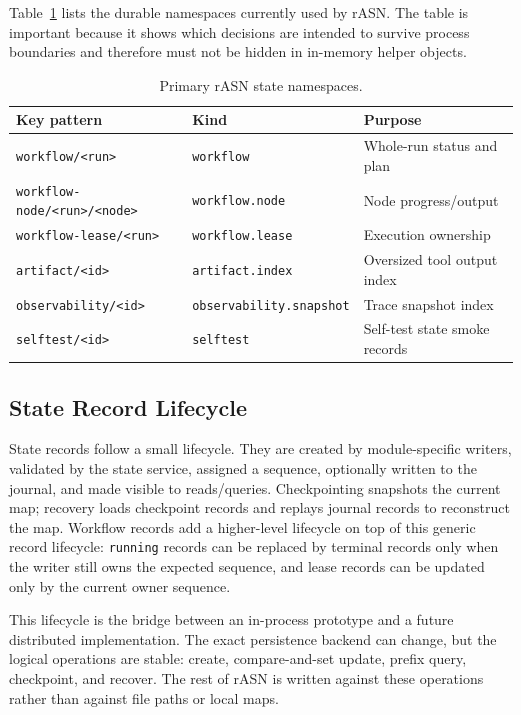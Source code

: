 \documentclass[manuscript,screen,review]{acmart}
\newcommand{\rasn}{rASN\xspace}
\begin{document}
Table~\ref{tab:state-namespace} lists the durable namespaces currently used by
\rasn. The table is important because it shows which decisions are intended to
survive process boundaries and therefore must not be hidden in in-memory helper
objects.

\begin{table}[t]
\caption{Primary \rasn state namespaces.}
\label{tab:state-namespace}
\centering
\begin{tabular}{lll}
\toprule
Key pattern & Kind & Purpose \\
\midrule
\texttt{workflow/<run>} & \texttt{workflow} & Whole-run status and plan \\
\texttt{workflow-node/<run>/<node>} & \texttt{workflow.node} & Node progress/output \\
\texttt{workflow-lease/<run>} & \texttt{workflow.lease} & Execution ownership \\
\texttt{artifact/<id>} & \texttt{artifact.index} & Oversized tool output index \\
\texttt{observability/<id>} & \texttt{observability.snapshot} & Trace snapshot index \\
\texttt{selftest/<id>} & \texttt{selftest} & Self-test state smoke records \\
\bottomrule
\end{tabular}
\end{table}

\subsection{State Record Lifecycle}

State records follow a small lifecycle. They are created by module-specific
writers, validated by the state service, assigned a sequence, optionally written
to the journal, and made visible to reads/queries. Checkpointing snapshots the
current map; recovery loads checkpoint records and replays journal records to
reconstruct the map. Workflow records add a higher-level lifecycle on top of
this generic record lifecycle: \texttt{running} records can be replaced by
terminal records only when the writer still owns the expected sequence, and
lease records can be updated only by the current owner sequence.

This lifecycle is the bridge between an in-process prototype and a future
distributed implementation. The exact persistence backend can change, but the
logical operations are stable: create, compare-and-set update, prefix query,
checkpoint, and recover. The rest of \rasn is written against these operations
rather than against file paths or local maps.
\end{document}
